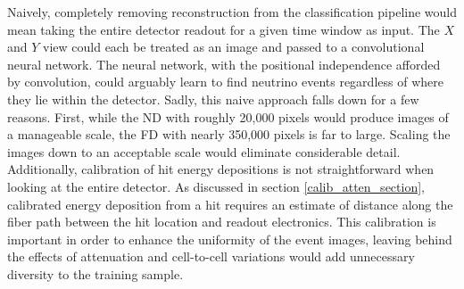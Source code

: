 Naively, completely removing reconstruction from the classification pipeline
would mean taking the entire detector readout for a given time window
as input.  The $X$ and $Y$ view could each be treated as an image and passed
to a convolutional neural network.
The neural network, with the positional independence afforded by convolution,
could arguably learn to find neutrino events regardless of where they lie
within the detector.
Sadly, this naive approach falls down for a few reasons.
First, while the ND with roughly 20,000 pixels would produce images of a
manageable scale, the FD with nearly 350,000 pixels is far to large.
Scaling the images down to an acceptable scale would eliminate considerable
detail.
Additionally, calibration of hit energy depositions is not straightforward
when looking at the entire detector.
As discussed in section \ref{calib_atten_section}, calibrated energy deposition
from a hit requires an estimate of distance along the fiber path
between the hit location and readout electronics.
This calibration is important in order to enhance the uniformity of the
event images, leaving behind the effects of attenuation and cell-to-cell
variations would add unnecessary diversity to the training sample.


